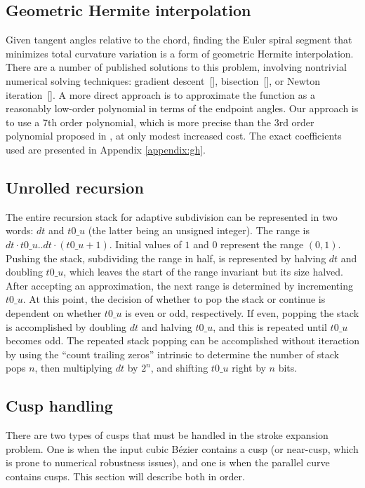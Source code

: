 \documentclass[sigconf, nonacm]{acmart}
\begin{document}
\subsection{Geometric Hermite interpolation}

Given tangent angles relative to the chord, finding the Euler spiral segment that minimizes total curvature variation is a form of geometric Hermite interpolation. There are a number of published solutions to this problem, involving nontrivial numerical solving techniques: gradient descent~[], bisection~[], or Newton iteration~[]. A more direct approach is to approximate the function as a reasonably low-order polynomial in terms of the endpoint angles. Our approach is to use a 7th order polynomial, which is more precise than the 3rd order polynomial proposed in \citet{Reif2021}, at only modest increased cost. The exact coefficients used are presented in Appendix \ref{appendix:gh}.

\subsection{Unrolled recursion}

The entire recursion stack for adaptive subdivision can be represented in two words: $dt$ and $t0\_u$ (the latter being an unsigned integer). The range is $dt \cdot t0\_u .. dt \cdot (t0\_u + 1)$. Initial values of $1$ and $0$ represent the range $(0, 1)$. Pushing the stack, subdividing the range in half, is represented by halving $dt$ and doubling $t0\_u$, which leaves the start of the range invariant but its size halved. After accepting an approximation, the next range is determined by incrementing $t0\_u$. At this point, the decision of whether to pop the stack or continue is dependent on whether $t0\_u$ is even or odd, respectively. If even, popping the stack is accomplished by doubling $dt$ and halving $t0\_u$, and this is repeated until $t0\_u$ becomes odd. The repeated stack popping can be accomplished without iteraction by using the ``count trailing zeros'' intrinsic to determine the number of stack pops $n$, then multiplying $dt$ by $2^n$, and shifting $t0\_u$ right by $n$ bits.

\subsection{Cusp handling}

There are two types of cusps that must be handled in the stroke expansion problem. One is when the input cubic Bézier contains a cusp (or near-cusp, which is prone to numerical robustness issues), and one is when the parallel curve contains cusps. This section will describe both in order.
\end{document}
